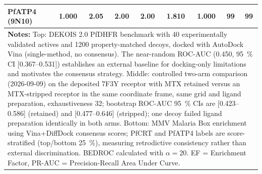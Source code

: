 \begin{table}[!htbp]
\begin{tabular}{lcccccccc}
PfATP4 (9N10) & \num{1.000} & \num{2.05} & \num{2.00} & \num{2.00} & \num{1.810} & \num{1.000} & \num{99} & \num{99} \\
\bottomrule
\multicolumn{9}{p{15cm}}{
\noindent\textbf{Notes:} Top: DEKOIS 2.0 PfDHFR benchmark with \num{40} experimentally validated actives and \num{1200} property-matched decoys, docked with AutoDock Vina (single-method, no consensus). The near-random ROC-AUC (\num{0.450}, \qty{95}{\percent} CI [\numrange{0.367}{0.531}]) establishes an external baseline for docking-only limitations and motivates the consensus strategy. Middle: controlled two-arm comparison (2026-09-09) on the deposited 7F3Y receptor with MTX retained versus an MTX-stripped receptor in the same coordinate frame, same grid and ligand preparation, exhaustiveness \num{32}; bootstrap ROC-AUC \qty{95}{\percent} CIs are [\numrange{0.423}{0.586}] (retained) and [\numrange{0.477}{0.646}] (stripped); one decoy failed ligand preparation identically in both arms. Bottom: MMV Malaria Box enrichment using Vina+DiffDock consensus scores; PfCRT and PfATP4 labels are score-stratified (top/bottom \qty{25}{\percent}), measuring retrodictive consistency rather than external discrimination. BEDROC calculated with $\alpha = \num{20}$. EF = Enrichment Factor, PR-AUC = Precision-Recall Area Under Curve.}
\end{tabular}
\end{table}
